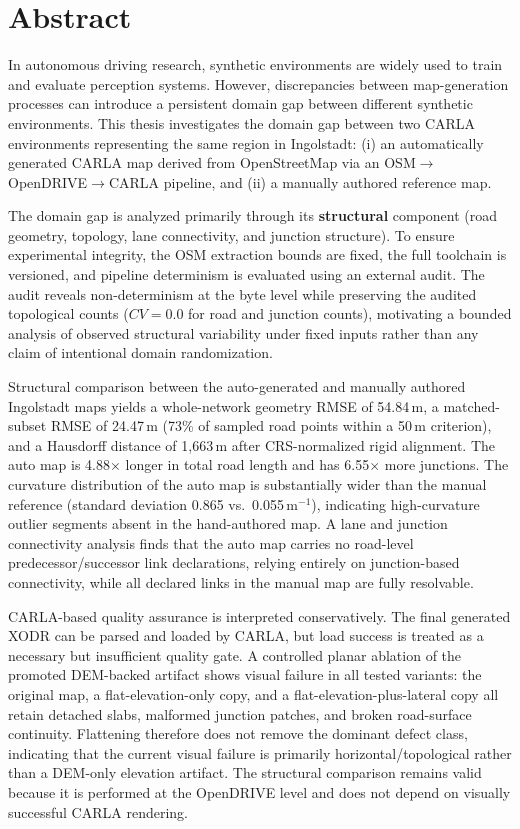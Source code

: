 \section*{Abstract}
In autonomous driving research, synthetic environments are widely used to train and evaluate perception systems. However, discrepancies between map-generation processes can introduce a persistent domain gap between different synthetic environments. This thesis investigates the domain gap between two CARLA environments representing the same region in Ingolstadt: (i) an automatically generated CARLA map derived from OpenStreetMap via an OSM$\rightarrow$OpenDRIVE$\rightarrow$CARLA pipeline, and (ii) a manually authored reference map.

The domain gap is analyzed primarily through its \textbf{structural} component (road geometry, topology, lane connectivity, and junction structure). To ensure experimental integrity, the OSM extraction bounds are fixed, the full toolchain is versioned, and pipeline determinism is evaluated using an external audit. The audit reveals non-determinism at the byte level while preserving the audited topological counts ($CV=0.0$ for road and junction counts), motivating a bounded analysis of observed structural variability under fixed inputs rather than any claim of intentional domain randomization.

Structural comparison between the auto-generated and manually authored Ingolstadt maps yields a whole-network geometry RMSE of 54.84\,m, a matched-subset RMSE of 24.47\,m (73\% of sampled road points within a 50\,m criterion), and a Hausdorff distance of 1{,}663\,m after CRS-normalized rigid alignment. The auto map is 4.88$\times$ longer in total road length and has 6.55$\times$ more junctions. The curvature distribution of the auto map is substantially wider than the manual reference (standard deviation 0.865 vs.\ 0.055\,m$^{-1}$), indicating high-curvature outlier segments absent in the hand-authored map. A lane and junction connectivity analysis finds that the auto map carries no road-level predecessor/successor link declarations, relying entirely on junction-based connectivity, while all declared links in the manual map are fully resolvable.

CARLA-based quality assurance is interpreted conservatively. The final generated XODR can be parsed and loaded by CARLA, but load success is treated as a necessary but insufficient quality gate. A controlled planar ablation of the promoted DEM-backed artifact shows visual failure in all tested variants: the original map, a flat-elevation-only copy, and a flat-elevation-plus-lateral copy all retain detached slabs, malformed junction patches, and broken road-surface continuity. Flattening therefore does not remove the dominant defect class, indicating that the current visual failure is primarily horizontal/topological rather than a DEM-only elevation artifact. The structural comparison remains valid because it is performed at the OpenDRIVE level and does not depend on visually successful CARLA rendering.

